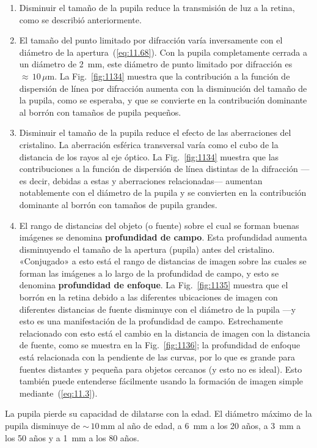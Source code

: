 \documentclass[12pt]{book}
\begin{document}
\begin{enumerate}
  \item Disminuir el tamaño de la pupila reduce la transmisión de luz a la retina, como se describió anteriormente.
  \item El tamaño del punto limitado por difracción varía inversamente con el diámetro de la apertura~(\ref{eq:11.68}). Con la pupila completamente cerrada a un diámetro de 2~mm, este diámetro de punto limitado por difracción es ${\approx}\,10\,\mu\text{m}$. La Fig.~\ref{fig:1134} muestra que la contribución a la función de dispersión de línea por difracción aumenta con la disminución del tamaño de la pupila, como se esperaba, y que se convierte en la contribución dominante al borrón con tamaños de pupila pequeños.
  \item Disminuir el tamaño de la pupila reduce el efecto de las aberraciones del cristalino. La aberración esférica transversal varía como el cubo de la distancia de los rayos al eje óptico. La Fig.~\ref{fig:1134} muestra que las contribuciones a la función de dispersión de línea distintas de la difracción ---es decir, debidas a estas y aberraciones relacionadas--- aumentan notablemente con el diámetro de la pupila y se convierten en la contribución dominante al borrón con tamaños de pupila grandes.
  \item El rango de distancias del objeto (o fuente) sobre el cual se forman buenas imágenes se denomina \textbf{profundidad de campo}. Esta profundidad aumenta disminuyendo el tamaño de la apertura (pupila) antes del cristalino. «Conjugado» a esto está el rango de distancias de imagen sobre las cuales se forman las imágenes a lo largo de la profundidad de campo, y esto se denomina \textbf{profundidad de enfoque}. La Fig.~\ref{fig:1135} muestra que el borrón en la retina debido a las diferentes ubicaciones de imagen con diferentes distancias de fuente disminuye con el diámetro de la pupila ---y esto es una manifestación de la profundidad de campo. Estrechamente relacionado con esto está el cambio en la distancia de imagen con la distancia de fuente, como se muestra en la Fig.~\ref{fig:1136}; la profundidad de enfoque está relacionada con la pendiente de las curvas, por lo que es grande para fuentes distantes y pequeña para objetos cercanos (y esto no es ideal). Esto también puede entenderse fácilmente usando la formación de imagen simple mediante~(\ref{eq:11.3}).
\end{enumerate}

La pupila pierde su capacidad de dilatarse con la edad. El diámetro máximo de la pupila disminuye de ${\sim}\,10\,\text{mm}$ al año de edad, a 6~mm a los 20 años, a 3~mm a los 50 años y a 1~mm a los 80 años.
\end{document}
